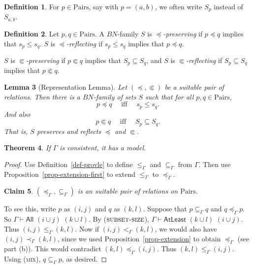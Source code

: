 \documentclass[letterpaper]{article} %
\newtheorem{theorem}{Theorem}[section]
\newtheorem{lemma}[theorem]{Lemma}
\newtheorem{claim}[theorem]{Claim}
\theoremstyle{definition}
\newtheorem{definition}[theorem]{Definition}
\newcommand{\quadiff}{\quad \mbox{ iff } \quad}
\newcommand{\Aunion}{\mathscr{A}^{\cup}}
\newcommand{\proverule}{\textsc}
\newcommand{\mix}{\proverule{mix}}
\newcommand{\All}[2]{\mathsf{All}\,\,#1\,\,#2}
\newcommand{\Atleast}[2]{\mathsf{AtLeast}\,\,#1\,\,#2}
\newcommand{\card}{\mathrm{card}}
\newcommand{\Pairs}{\mbox{Pairs}}
\newcommand{\precsubseteq}{\Subset}
\newcommand{\suitable}{suitable}%
\newcommand{\provsub}{\subseteq_{\Gamma}}
\newcommand{\provle}{\le_{\Gamma}}
\newcommand{\provlt}{<_{\Gamma}}
\newcommand{\provlestrict}{\provlt}
\newcommand{\provextended}{\preceq_{\Gamma}}
\newcommand{\provextendedstrict}{\prec_{\Gamma}}
\begin{document}
{\begin{definition}
For $p\in\Pairs$, say with $p= (a,b)$, we often write $S_p$ instead of $S_{a,b}$.
\end{definition}

\begin{definition}
Let $p,q\in \Pairs$.
A $BN$-family $S$ is \emph{$\preceq$-preserving} if 
$p \preceq q$ implies that $s_{p} \le s_{q}$.  $S$ is \emph{$\preceq$-reflecting} if $s_{p} \le s_{q}$ implies that $p \preceq q$.

 $S$ is \emph{$\precsubseteq$-preserving}
if $p \precsubseteq q$ implies that $S_{p} \subseteq S_{q}$, and 
$S$ is \emph{$\precsubseteq$-reflecting} if 
$S_{p} \subseteq S_{q}$ implies that $p \precsubseteq  q$. 
\end{definition}


\begin{lemma} [Representation Lemma]
Let $(\preceq, \precsubseteq)$ be a suitable pair of relations.
Then there is a $BN$-family of sets $S$
such that for all $p,q\in\Pairs$,
\begin{equation}
    \label{goal-main1-first}
p \preceq q \quadiff 
 s_{p}\leq s_q.
 \end{equation}
 And also
 \begin{equation}
    \label{goal-main2-first}
 p \precsubseteq  q \quadiff 
S_{p}\subseteq S_{q}.
 \end{equation}
 That is, $S$ preserves and reflects $\preceq$ and $\precsubseteq$.
 \label{lemma-representation-first}
 \end{lemma}
 
\begin{theorem}
    If $\Gamma$ is consistent, it has a model.
\end{theorem} 

\begin{proof}
Use Definition~\ref{def-provle}
to define $\provle$ and $\provsub$ from $\Gamma$.  Then use
Proposition~\ref{prop-extension-first} to extend $\provle$ to $\provextended$.

\begin{claim}
$(\provextended, \provsub)$ is an  \suitable{} pair of relations on $\Pairs$.
\end{claim}
To see this,
write $p$ as $(i,j)$ and $q$ as $(k,l)$.
    Suppose that $p \provsub q$ and $q \provextended p$.  
    So $\Gamma \vdash \All{(i \cup j)}{(k \cup l)}$.  
    By ($\proverule{subset-size}$), $\Gamma \vdash \Atleast{(k \cup l)}{(i \cup j)}$.  
    Thus  $(i,j)\provle (k,l)$.
   Now if $(i,j)\provlestrict (k,l)$, we would also have $(i,j)\provextendedstrict (k,l)$,
    since we used  Proposition~\ref{prop-extension} to obtain $\provextended$ (see part (b)).  
    This would contradict $(k, l) \provextended (i, j)$.  
     Thus $(k,l)\provle (i,j)$.  Using (\mix),  $q \provsub p$, as desired.
     

\end{proof}}
\end{document}
